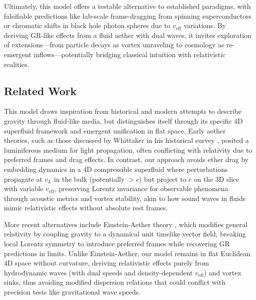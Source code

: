 \documentclass{article}
\begin{document}
Ultimately, this model offers a testable alternative to established paradigms, with falsifiable predictions like lab-scale frame-dragging from spinning superconductors or chromatic shifts in black hole photon spheres due to $v_{\text{eff}}$ variations. By deriving GR-like effects from a fluid aether with dual waves, it invites exploration of extensions---from particle decays as vortex unraveling to cosmology as re-emergent inflows---potentially bridging classical intuition with relativistic realities.

\subsection{Related Work}

This model draws inspiration from historical and modern attempts to describe gravity through fluid-like media, but distinguishes itself through its specific 4D superfluid framework and emergent unification in flat space. Early aether theories, such as those discussed by Whittaker in his historical survey \cite{whittaker1951history}, posited a luminiferous medium for light propagation, often conflicting with relativity due to preferred frames and drag effects. In contrast, our approach avoids ether drag by embedding dynamics in a 4D compressible superfluid where perturbations propagate at $v_L$ in the bulk (potentially $>c$) but project to $c$ on the 3D slice with variable $v_{\text{eff}}$, preserving Lorentz invariance for observable phenomena through acoustic metrics and vortex stability, akin to how sound waves in fluids mimic relativistic effects without absolute rest frames.

More recent alternatives include Einstein-Aether theory \cite{jacobson2004einstein}, which modifies general relativity by coupling gravity to a dynamical unit timelike vector field, breaking local Lorentz symmetry to introduce preferred frames while recovering GR predictions in limits. Unlike Einstein-Aether, our model remains in flat Euclidean 4D space without curvature, deriving relativistic effects purely from hydrodynamic waves (with dual speeds and density-dependent $v_{\text{eff}}$) and vortex sinks, thus avoiding modified dispersion relations that could conflict with precision tests like gravitational wave speeds.
\end{document}
